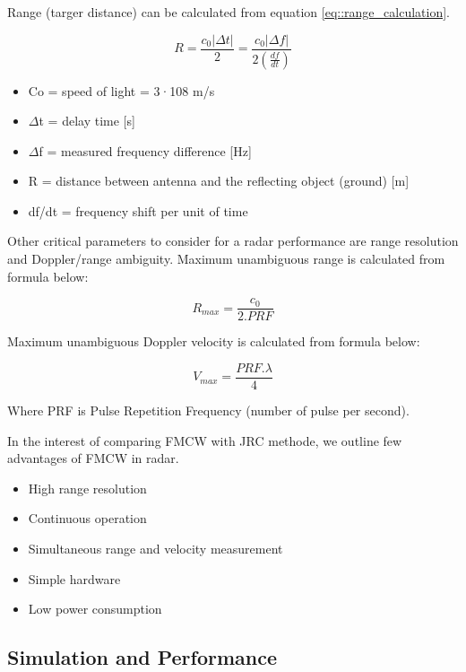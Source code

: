 \documentclass[conference]{IEEEtran}
\begin{document}
	Range (targer distance) can be calculated from equation \ref{eq::range_calculation}. %
	
	\begin{equation}
		R = \frac{c_0|{\Delta}t|}{2} = \frac{c_0|{\Delta}f|}{2\left(\frac{df}{dt}\right)}
		\label{eq::range_calculation}
	\end{equation}
	
	\begin{itemize}
	\item Co = speed of light = 3·108 m/s
	\item \(\Delta \)t = delay time [s]
	\item \(\Delta \)f = measured frequency difference [Hz]
	\item R = distance between antenna and the reflecting object (ground) [m]
	\item df/dt = frequency shift per unit of time
	\end{itemize}

Other critical parameters to consider for a radar performance are range resolution and Doppler/range ambiguity. 
Maximum unambiguous range is calculated from formula below:

	\begin{equation}
		R_{max} = \frac{c_0}{2.PRF}
		\label{eq:: range ambiguity_calculation}
	\end{equation}

Maximum unambiguous Doppler velocity is calculated from formula below:

\begin{equation}
		V_{max} = \frac{PRF.\lambda}{4}
		\label{eq:: Doppler ambiguity_calculation}
	\end{equation}
  
  Where PRF is Pulse Repetition Frequency (number of pulse per second).

In the interest of comparing FMCW with JRC methode, we outline few advantages of FMCW in radar.
	\begin{itemize}
		\item High range resolution
		\item Continuous operation
		\item Simultaneous range and velocity measurement
		\item Simple hardware
		\item Low power consumption
	\end{itemize}
	



	\subsection {Simulation and Performance}
\end{document}
